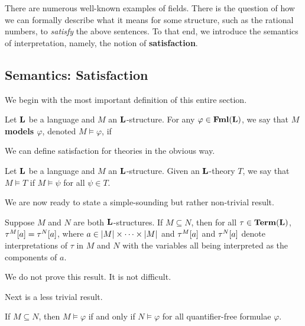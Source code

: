 There are numerous well-known examples of fields. There is the question of how we can formally describe what it means for some structure, such as the rational numbers, to \textit{satisfy} the above sentences. To that end, we introduce the semantics of interpretation, namely, the notion of \textbf{satisfaction}.

\subsection{Semantics: Satisfaction}

We begin with the most important definition of this entire section.

\begin{boxdefinition}
    Let $\mathbf{L}$ be a language and $M$ an $\mathbf{L}$-structure. For any $\varphi \in \mathbf{Fml}\!\left( \mathbf{L} \right)$, we say that \textbf{$M$ models $\varphi$}, denoted $M \models \varphi$, if \sorry %
\end{boxdefinition}

We can define satisfaction for theories in the obvious way.

\begin{boxdefinition}
    Let $\mathbf{L}$ be a language and $M$ an $\mathbf{L}$-structure. Given an $\mathbf{L}$-theory $T$, we say that $M \models T$ if $M \models \psi$ for all $\psi \in T$.
\end{boxdefinition}

We are now ready to state a simple-sounding but rather non-trivial result.

\begin{boxlemma}
    Suppose $M$ and $N$ are both $\mathbf{L}$-structures. If $M \subseteq N$, then for all $\tau \in \mathbf{Term}\!\left( \mathbf{L} \right)$, $\tau^{M}\!\left[ a \right] = \tau^N\!\left[ a \right]$, where $a \in \left\lvert M \right\rvert \times \cdots \times \left\lvert M \right\rvert$ and $\tau^M\!\left[ a \right]$ and $\tau^N\!\left[ a \right]$ denote interpretations of $\tau$ in $M$ and $N$ with the variables all being interpreted as the components of $a$.
\end{boxlemma}

We do not prove this result. It is not difficult.

Next is a less trivial result.

\begin{boxlemma}
    If $M \subseteq N$, then $M \models \varphi$ if and only if $N \models \varphi$ for all quantifier-free formulae $\varphi$.
\end{boxlemma}

